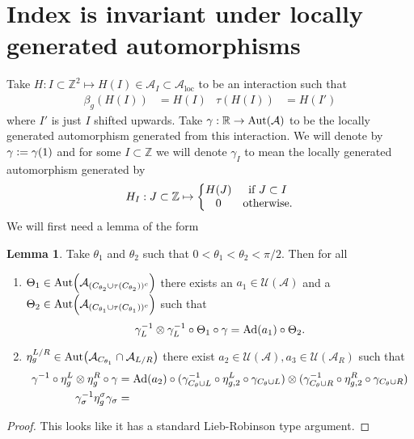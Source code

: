 \documentclass[12pt,a4paper,twoside]{article}
\newcommand{\defeq}{\vcentcolon=}
\let\originalleft\left
\let\originalright\right
\renewcommand{\left}{\mathopen{}\mathclose\bgroup\originalleft}
\renewcommand{\right}{\aftergroup\egroup\originalright}
\newcommand{\UU}{\mathcal U}
\newcommand{\ZZ}{\mathbb Z}
\renewcommand{\AA}{\mathcal A}
\newcommand{\RR}{\mathbb R}
\newcommand{\Ad}[1]{\textrm{Ad}\left(#1\right)}
\newcommand{\Aut}[1]{\textrm{Aut}\left(#1\right)}
\theoremstyle{definition}
\newtheorem{lemma}[theorem]{Lemma}
\numberwithin{equation}{section}
\begin{document}
\section{Index is invariant under locally generated automorphisms}
Take $H:I\subset \ZZ^2\mapsto H(I)\in\AA_I\subset\AA_{\text{loc}}$ to be an interaction such that
\begin{align}
\beta_g(H(I))&=H(I)&\tau(H(I))&=H(I')
\end{align}
where $I'$ is just $I$ shifted upwards. Take $\gamma:\RR\rightarrow\Aut{\AA}$ to be the locally generated automorphism generated from this interaction. We will denote by $\gamma\defeq \gamma(1)$ and for some $I\subset \ZZ$ we will denote $\gamma_I$ to mean the locally generated automorphism generated by 
\begin{equation}
	H_I:J\subset\ZZ\mapsto\left\{\begin{matrix}H(J)&\text{if }J\subset I\\0&\text{otherwise.}\end{matrix}\right.
\end{equation}
We will first need a lemma of the form
\begin{lemma}\label{lem:TwoAngleLemma}
	Take $\theta_1$ and $\theta_2$ such that $0<\theta_1<\theta_2<\pi/2$. Then for all
	\begin{enumerate}
		\item $\Theta_1\in\Aut{\AA_{(C_{\theta_2}\cup \tau(C_{\theta_2}))^c}}$ there exists an $a_1\in\UU(\AA)$ and a $\Theta_2\in\Aut{\AA_{(C_{\theta_1}\cup \tau(C_{\theta_1}))^c}}$ such that
		\begin{equation}
		\gamma_{L}^{-1}\otimes\gamma_{L}^{-1}\circ\Theta_1\circ\gamma=\Ad{a_1}\circ\Theta_2.
		\end{equation}
		\item $\eta_{g}^{L/R}\in\Aut{\AA_{C_{\theta_1}}\cap\AA_{L/R}}$ there exist $a_2\in\UU(\AA),a_3\in\UU(\AA_R)$ such that
		\begin{align}
		\gamma^{-1}\circ\eta_{g}^L\otimes\eta_{g}^R\circ\gamma&=\Ad{a_2}\circ(\gamma_{C_\theta\cup L}^{-1}\circ \eta_{g,2}^L \circ\gamma_{C_\theta\cup L})\otimes(\gamma_{C_\theta\cup R}^{-1}\circ\eta_{g,2}^R\circ\gamma_{C_\theta\cup R})\\
		\gamma_\sigma^{-1}\eta_g^\sigma\gamma_\sigma&=
		\end{align}
	\end{enumerate}
\end{lemma}
\begin{proof}
	This looks like it has a standard Lieb-Robinson type argument.
\end{proof}
\end{document}
